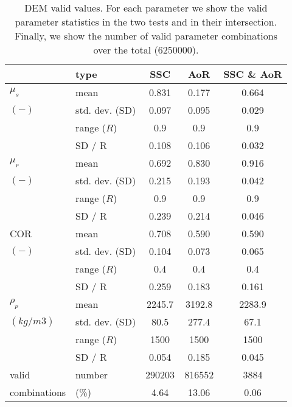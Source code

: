 \documentclass[review]{elsarticle}
\begin{document}
\begin{table}[h]
\centering
\begin{tabular}{llccc}
\hline

          & type  & SSC & AoR   & SSC \& AoR \\
          \hline

    $\mu_s$ & mean  & 0.831 & 0.177 & 0.664 \\
    $(-)$   & std. dev. (SD) & 0.097 & 0.095 & 0.029 \\
          & range ($R$) & 0.9   & 0.9   & 0.9 \\
          & SD / R & 0.108 & 0.106 & 0.032 \\
          \hline
    $\mu_r$ & mean  & 0.692 & 0.830 & 0.916 \\
    $(-)$   & std. dev. (SD) & 0.215 & 0.193 & 0.042 \\
          & range ($R$) & 0.9   & 0.9   & 0.9 \\
          & SD / R & 0.239 & 0.214 & 0.046 \\
          \hline
              COR   & mean  & 0.708 & 0.590 & 0.590 \\
    $(-)$   & std. dev. (SD) & 0.104 & 0.073 & 0.065 \\
          & range ($R$) & 0.4   & 0.4   & 0.4 \\
          & SD / R & 0.259 & 0.183 & 0.161 \\
          \hline
    $\rho_p$ & mean  & 2245.7 & 3192.8 & 2283.9 \\
    $(kg/m3)$ & std. dev. (SD) & 80.5  & 277.4 & 67.1 \\
          & range ($R$) & 1500  & 1500  & 1500 \\
          & SD / R & 0.054 & 0.185 & 0.045 \\
          \hline
    valid & number & 290203 & 816552 & 3884 \\
    combinations & (\%) & 4.64  & 13.06 & 0.06 \\  

\hline
\end{tabular}
\caption[DEM valid values]{DEM valid values. For each parameter we show the
valid parameter statistics in the two tests and in their intersection.
Finally, we show the number of valid parameter combinations over the total
(6250000).}
\label{tab:13DEMvalidvalues}
\end{table}
\end{document}
